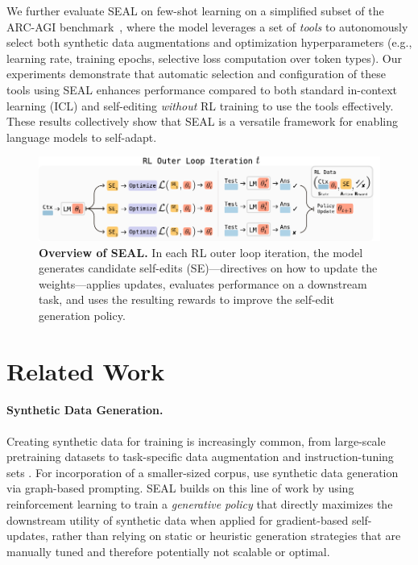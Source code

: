 \documentclass{article}
\newcommand{\methodacronym}{SEAL\xspace}
\begin{document}
We further evaluate \methodacronym on few-shot learning on a simplified subset of the ARC-AGI benchmark~\citep{chollet2019ARC}, where the model leverages a set of \textit{tools} to autonomously select both synthetic data augmentations and optimization hyperparameters (e.g., learning rate, training epochs, selective loss computation over token types). Our experiments demonstrate that automatic selection and configuration of these tools using \methodacronym enhances performance compared to both standard in-context learning (ICL) and self-editing \textit{without} RL training to use the tools effectively. These results collectively show that \methodacronym is a versatile framework for enabling language models to self-adapt.

\begin{figure}[t]
    \centering
    \includegraphics[width=1\linewidth]{figures/main_fig.pdf}
    \caption{\textbf{Overview of \methodacronym.} In each RL outer loop iteration, the model generates candidate self-edits (SE)---directives on how to update the weights---applies updates, evaluates performance on a downstream task, and uses the resulting rewards to improve the self-edit generation policy.}
    \vspace{-8pt}
\label{fig:self_edit}
\end{figure}

\section{Related Work}
\paragraph{Synthetic Data Generation.} Creating synthetic data for training is increasingly common, from large-scale pretraining datasets \citep{eldan2023tinystories, gunasekar2024textbooks, maini2024rephrasingweb} to task-specific data augmentation \citep{tang2023doessyntheticdatageneration, gandhi2024bettersyntheticdataretrieving} and instruction-tuning sets \citep{wang2023selfinstructaligninglanguagemodels, peng2023instructiontuninggpt4}. For incorporation of a smaller-sized corpus, \citet{yang2025synthetic} use synthetic data generation via graph-based prompting. \methodacronym builds on this line of work by using reinforcement learning to train a \textit{generative policy} that directly maximizes the downstream utility of synthetic data when applied for gradient-based self-updates, rather than relying on static or heuristic generation strategies that are manually tuned and therefore potentially not scalable or optimal. 
\end{document}
